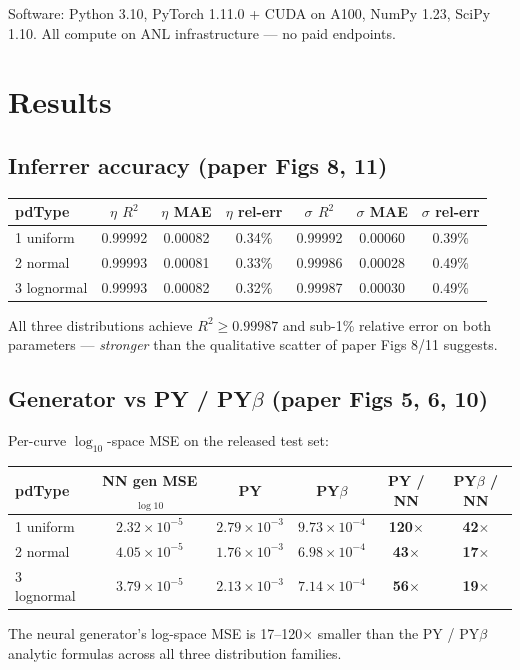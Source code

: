 \documentclass[11pt]{article}
\begin{document}
Software: Python 3.10, PyTorch 1.11.0 + CUDA on A100, NumPy 1.23, SciPy
1.10. All compute on ANL infrastructure --- no paid endpoints.

\section{Results}

\subsection{Inferrer accuracy (paper Figs 8, 11)}
\begin{center}
\begin{tabular}{lcccccc}
\toprule
pdType & $\eta$ $R^2$ & $\eta$ MAE & $\eta$ rel-err & $\sigma$ $R^2$ & $\sigma$ MAE & $\sigma$ rel-err \\
\midrule
1 uniform   & 0.99992 & 0.00082 & 0.34\% & 0.99992 & 0.00060 & 0.39\% \\
2 normal    & 0.99993 & 0.00081 & 0.33\% & 0.99986 & 0.00028 & 0.49\% \\
3 lognormal & 0.99993 & 0.00082 & 0.32\% & 0.99987 & 0.00030 & 0.49\% \\
\bottomrule
\end{tabular}
\end{center}
All three distributions achieve $R^2\!\ge\!0.99987$ and sub-1\% relative
error on both parameters --- \emph{stronger} than the qualitative scatter
of paper Figs 8/11 suggests.

\subsection{Generator vs PY / PY$\beta$ (paper Figs 5, 6, 10)}
Per-curve $\log_{10}$-space MSE on the released test set:
\begin{center}
\begin{tabular}{lccccc}
\toprule
pdType & NN gen MSE$_{\log10}$ & PY & PY$\beta$ & PY / NN & PY$\beta$ / NN \\
\midrule
1 uniform   & $2.32\!\times\!10^{-5}$ & $2.79\!\times\!10^{-3}$ & $9.73\!\times\!10^{-4}$ & \textbf{120}$\times$ & \textbf{42}$\times$ \\
2 normal    & $4.05\!\times\!10^{-5}$ & $1.76\!\times\!10^{-3}$ & $6.98\!\times\!10^{-4}$ & \textbf{43}$\times$  & \textbf{17}$\times$ \\
3 lognormal & $3.79\!\times\!10^{-5}$ & $2.13\!\times\!10^{-3}$ & $7.14\!\times\!10^{-4}$ & \textbf{56}$\times$  & \textbf{19}$\times$ \\
\bottomrule
\end{tabular}
\end{center}
The neural generator's log-space MSE is 17--120$\times$ smaller than the
PY / PY$\beta$ analytic formulas across all three distribution families.
\end{document}
